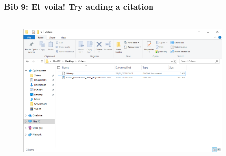 \documentclass[12pt]{beamer}
\begin{document}
\begin{frame} \frametitle{Bib 9: Et voila! Try adding a citation} \begin{figure}[!h] \centering
	\includegraphics[height=3in, width = 4.25in,keepaspectratio]{zotero/bibtex_9.png}
\end{figure} \end{frame}
\end{document}
